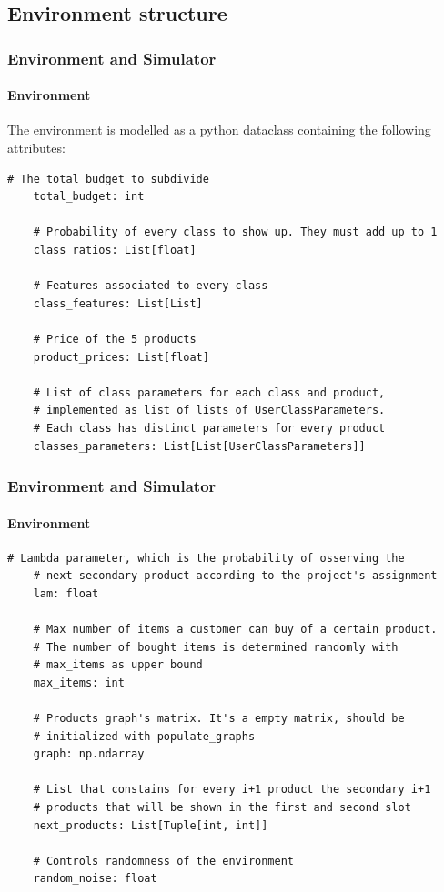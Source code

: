 \documentclass[11pt]{beamer}
\begin{document}

\subsection{Environment structure}


\begin{frame}[fragile]

\frametitle{Environment and Simulator}
\framesubtitle{Environment}

The environment is modelled as a python dataclass containing the following attributes:

\begin{lstlisting}[style=Python, basicstyle=\tiny, numbers=none, framexrightmargin=-20pt]
    # The total budget to subdivide
    total_budget: int

    # Probability of every class to show up. They must add up to 1
    class_ratios: List[float]

    # Features associated to every class
    class_features: List[List]

    # Price of the 5 products
    product_prices: List[float]

    # List of class parameters for each class and product,
    # implemented as list of lists of UserClassParameters.
    # Each class has distinct parameters for every product
    classes_parameters: List[List[UserClassParameters]]
\end{lstlisting}

\end{frame}


\begin{frame}[fragile]

\frametitle{Environment and Simulator}
\framesubtitle{Environment}

\begin{lstlisting}[style=Python, basicstyle=\tiny, numbers=none, framexrightmargin=-20pt]
    # Lambda parameter, which is the probability of osserving the
    # next secondary product according to the project's assignment
    lam: float

    # Max number of items a customer can buy of a certain product.
    # The number of bought items is determined randomly with
    # max_items as upper bound
    max_items: int

    # Products graph's matrix. It's a empty matrix, should be
    # initialized with populate_graphs
    graph: np.ndarray

    # List that constains for every i+1 product the secondary i+1
    # products that will be shown in the first and second slot
    next_products: List[Tuple[int, int]]

    # Controls randomness of the environment
    random_noise: float
\end{lstlisting}

\end{frame}
\end{document}
